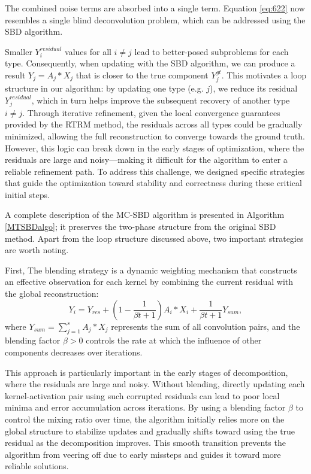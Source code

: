 \noindent The combined noise terms are absorbed into a single term. Equation \ref{eq:622} now resembles a single blind deconvolution problem, which can be addressed using the \ac{SBD} algorithm.

Smaller $Y_i^{residual}$ values for all $i \neq j$ lead to better-posed subproblems for each type. Consequently, when updating with the \ac{SBD} algorithm, we can produce a result $Y_j = A_j* X_j$ that is closer to the true component $Y_j^{gt}$. This motivates a loop structure in our algorithm: by updating one type (e.g. $j$), we reduce its residual $Y_j^{residual}$, which in turn helps improve the subsequent recovery of another type $i \neq j$. Through iterative refinement, given the local convergence guarantees provided by the \ac{RTRM} method, the residuals across all types could be gradually minimized, allowing the full reconstruction to converge towards the ground truth. However, this logic can break down in the early stages of optimization, where the residuals are large and noisy—making it difficult for the algorithm to enter a reliable refinement path. To address this challenge, we designed specific strategies that guide the optimization toward stability and correctness during these critical initial steps.

A complete description of the \ac{MC-SBD} algorithm is presented in Algorithm \ref{MTSBDalgo}; it preserves the two-phase structure from the original \ac{SBD} method. Apart from the loop structure discussed above, two important strategies are worth noting. 

First, The blending strategy is a dynamic weighting mechanism that constructs an effective observation for each kernel by combining the current residual with the global reconstruction: 
\begin{equation}
	Y_i = Y_{res} + \left(1-\frac{1}{\beta t+1}\right)A_i * X_i + \frac{1}{\beta t+1}Y_{sum},
\end{equation}
\noindent where $Y_{sum} = \sum_{j=1}^s A_j * X_j$ represents the sum of all convolution pairs, and the blending factor $\beta > 0$ controls the rate at which the influence of other components decreases over iterations.

This approach is particularly important in the early stages of decomposition, where the residuals are large and noisy. Without blending, directly updating each kernel-activation pair using such corrupted residuals can lead to poor local minima and error accumulation across iterations. By using a blending factor $\beta$ to control the mixing ratio over time, the algorithm initially relies more on the global structure to stabilize updates and gradually shifts toward using the true residual as the decomposition improves. This smooth transition prevents the algorithm from veering off due to early missteps and guides it toward more reliable solutions.

